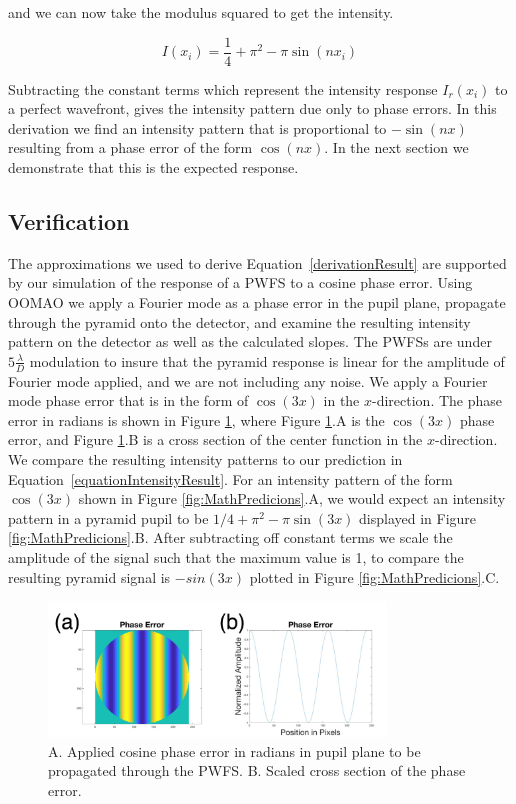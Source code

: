 \noindent and we can now take the modulus squared to get the intensity.

\begin{equation}
    I(x_i)=\frac{1}{4}+\pi^2-\pi \sin(nx_i)
    \label{equationIntensityResult}
\end{equation}

Subtracting the constant terms which represent the intensity response $I_r (x_i )$ to a perfect wavefront, gives the intensity pattern due only to phase errors. In this derivation we find an intensity pattern that is proportional to $-\sin(nx)$ resulting from a phase error of the form $\cos(nx)$. In the next section we demonstrate that this is the expected response.

\subsection{Verification}

The approximations we used to derive Equation~\ref{derivationResult} are supported by our simulation of the response of a PWFS to a cosine phase error. Using OOMAO we apply a Fourier mode as a phase error in the pupil plane, propagate through the pyramid onto the detector, and examine the resulting intensity pattern on the detector as well as the calculated slopes. The PWFSs are under $5 \frac{\lambda}{D}$ modulation to insure that the pyramid response is linear for the amplitude of Fourier mode applied, and we are not including any noise. We apply a Fourier mode phase error that is in the form of $\cos(3x)$ in the $x$-direction. The phase error in radians is shown in Figure \ref{fig:CosinePhaseDiagram}, where Figure \ref{fig:CosinePhaseDiagram}.A is the $\cos(3x)$ phase error, and Figure \ref{fig:CosinePhaseDiagram}.B is a cross section of the center function in the $x$-direction. We compare the resulting intensity patterns to our prediction in Equation~\ref{equationIntensityResult}. For an intensity pattern of the form $\cos(3x)$ shown in Figure \ref{fig:MathPredicions}.A, we would expect an intensity pattern in a pyramid pupil to be $1/4+\pi^2-\pi \sin(3x)$ displayed in Figure \ref{fig:MathPredicions}.B. After subtracting off constant terms we scale the amplitude of the signal such that the maximum value is 1, to compare the resulting pyramid signal is $-sin(3x)$ plotted in Figure \ref{fig:MathPredicions}.C.


\begin{figure}
    \centering
    \includegraphics[width=0.8\textwidth]{Chapter Materials/Chapter Two Materials/CosinePhaseDiagram.png}
    \caption{A. Applied cosine phase error in radians in pupil plane to be propagated through the PWFS. B. Scaled cross section of the phase error.}
    \label{fig:CosinePhaseDiagram}
\end{figure}


